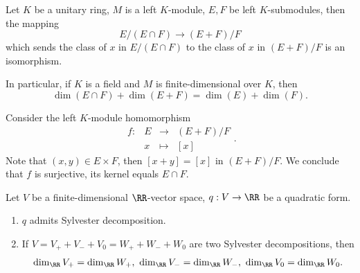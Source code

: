\begin{propositionenv}
    Let $K$ be a unitary ring, $M$ is a left $K$-module, $E,F$ be left $K$-submodules, then the mapping
    $$ E/(E\cap F )\rightarrow (E+F)/ F$$
    which sends the class of $x$ in $E/(E\cap F)$ to the class of $x$ in $(E+F)/F$ is an isomorphism.
    
    \quad In particular, if $K$ is a field and $M$ is finite-dimensional over $K$, then
    $$ \dim \left(E\cap F\right) + \dim \left(E+F\right) = \dim\left(E\right) + \dim \left(F\right).$$
\end{propositionenv}
\begin{proofenv}
    Consider the left $K$-module homomorphism
    $$ \begin{array}{rrcl}
        f: & E & \rightarrow & (E+F)/F\\
        & x & \mapsto & [x]
    \end{array}.$$
    Note that $(x,y)\in E\times F$, then $[x+y] = [x]$ in $(E+F)/F$.
    We conclude that $f$ is surjective, its kernel equals $E\cap F$.
\end{proofenv}
\begin{theoremenv}
    Let $V$ be a finite-dimensional $\RR$-vector space, $q : V\rightarrow \RR$ be a quadratic form.
    \begin{enumerate}
        \item $q$ admits Sylvester decomposition.
        \item If $V = V_+ + V_- +V_0 = W_+ +W_- + W_0$ are two Sylvester decompositions, then
        $$ \dim_{\RR} V_+ = \dim_{\RR} W_+,\ \dim_{\RR} V_- = \dim_{\RR} W_-,\ \dim_{\RR} V_0 = \dim_{\RR} W_0.$$
    \end{enumerate}
\end{theoremenv}
